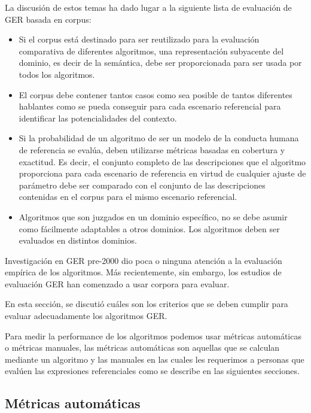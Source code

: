 La discusi\'on de estos temas ha dado lugar a la siguiente lista de evaluaci\'on de GER basada en corpus:
\begin{itemize}
\item Si el corpus est\'a destinado para ser reutilizado para la evaluaci\'on comparativa de diferentes
algoritmos, una representaci\'on subyacente del dominio, es decir de la sem\'antica, debe ser proporcionada para ser usada por todos los algoritmos.

\item El corpus debe contener tantos casos como sea posible de tantos diferentes hablantes como se pueda conseguir para cada escenario referencial para identificar las potencialidades del contexto. 

\item Si la probabilidad de un algoritmo de ser un modelo de la conducta humana de referencia
se eval\'ua, deben utilizarse m\'etricas basadas en cobertura y exactitud. Es decir, el conjunto completo de las descripciones que el algoritmo proporciona para cada
escenario de referencia en virtud de cualquier ajuste de par\'ametro debe ser comparado con el
conjunto de las descripciones contenidas en el corpus para el mismo escenario referencial.

\item Algoritmos que son juzgados en un dominio espec\'ifico, no se debe asumir como
f\'acilmente adaptables a otros dominios. Los algoritmos deben ser evaluados en distintos dominios.
\end{itemize}

Investigaci\'on en GER pre-2000 dio poca o ninguna atenci\'on a la evaluaci\'on emp\'irica de los algoritmos. M\'as 
recientemente, sin embargo, los estudios de evaluaci\'on GER han comenzado a usar corpora para evaluar.

En esta secci\'on, se discuti\'o cu\'ales son los criterios que se deben cumplir
para evaluar adecuadamente los algoritmos GER.

Para medir la performance de los algoritmos podemos usar m\'etricas autom\'aticas o m\'etricas manuales, las m\'etricas autom\'aticas son aquellas que se calculan mediante un algoritmo y las manuales en las cuales les requerimos a personas que eval\'uen las expresiones referenciales como se describe en las siguientes secciones.


\subsection{M\'etricas autom\'aticas}
\label{sec:metricasAutomaticas}

